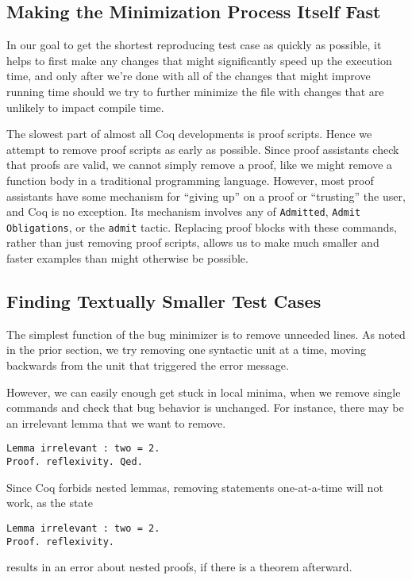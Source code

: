 \documentclass[a4paper,USenglish,cleveref,autoref,thm-restate]{lipics-v2021}
\begin{document}
\subsection{Making the Minimization Process Itself Fast}

In our goal to get the shortest reproducing test case as quickly as possible, it helps to first make any changes that might significantly speed up the execution time, and only after we're done with all of the changes that might improve running time should we try to further minimize the file with changes that are unlikely to impact compile time.

The slowest part of almost all Coq developments is proof scripts.
Hence we attempt to remove proof scripts as early as possible.
Since proof assistants check that proofs are valid, we cannot simply remove a proof, like we might remove a function body in a traditional programming language.
However, most proof assistants have some mechanism for ``giving up'' on a proof or ``trusting'' the user, and Coq is no exception.
Its mechanism involves any of \verb|Admitted|, \verb|Admit Obligations|, or the \verb|admit| tactic.
Replacing proof blocks with these commands, rather than just removing proof scripts, allows us to make much smaller and faster examples than might otherwise be possible.

\subsection{Finding Textually Smaller Test Cases}

The simplest function of the bug minimizer is to remove unneeded lines.
As noted in the prior section, we try removing one syntactic unit at a time, moving backwards from the unit that triggered the error message.

However, we can easily enough get stuck in local minima, when we remove single commands and check that bug behavior is unchanged.
For instance, there may be an irrelevant lemma that we want to remove.
\begin{verbatim}
Lemma irrelevant : two = 2.
Proof. reflexivity. Qed.
\end{verbatim}
Since Coq forbids nested lemmas, removing statements one-at-a-time will not work, as the state
\begin{verbatim}
Lemma irrelevant : two = 2.
Proof. reflexivity.
\end{verbatim}
results in an error about nested proofs, if there is a theorem afterward.
\end{document}
